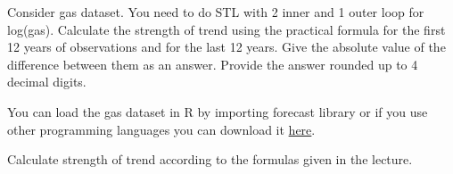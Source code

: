 
\begin{question}
Consider gas dataset. You need to do STL with 2 inner and 1 outer loop for log(gas). Calculate the strength of trend using the practical formula for the first 12 years of observations and for the last 12 years. Give the absolute value of the difference between them as an answer. Provide the answer rounded up to 4 decimal digits.

You can load the gas dataset in R by importing forecast library or if you use other programming languages you can download it \href{https://github.com/vincentarelbundock/Rdatasets/blob/master/csv/forecast/gas.csv}{here}.
\end{question}

\begin{solution}
Calculate strength of trend according to the formulas given in the lecture.
\end{solution}

